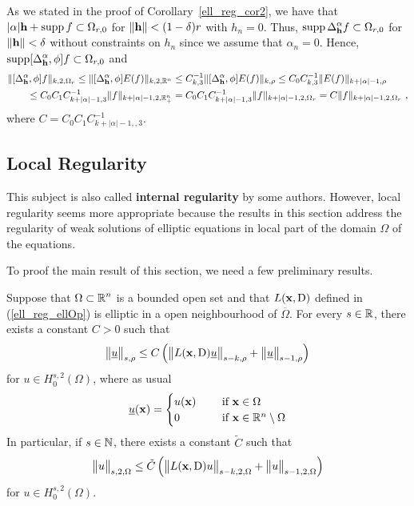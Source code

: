 \begin{rmk}
As we stated in the proof of Corollary~\ref{ell_reg_cor2},
we have that $|\alpha| \mathbf{h} + \operatorname{supp} f \subset \Omega_{r,0}$
for $\|\mathbf{h}\| < (1-\delta)r$ with $h_n = 0$.    Thus,
$\displaystyle \operatorname{supp} \Delta^\alpha_{\mathbf{h}} f \subset \Omega_{r,0}$ for
$\|\mathbf{h}\| < \delta$ without constraints on $h_n$ since we assume
that $\alpha_n = 0$.  Hence,
$\displaystyle \operatorname{supp} [\Delta^\alpha_{\mathbf{h}}, \phi] f \subset \Omega_{r,0}$
and
\begin{align*}
&\| [\Delta^\alpha_{\mathbf{h}}, \phi] f \|_{k,2,\Omega_r}
\leq \| [\Delta^\alpha_{\mathbf{h}}, \phi] E(f) \|_{k,2,\mathbb{R}^n}
\leq C_{k,3}^{-1} \| [\Delta^\alpha_{\mathbf{h}}, \phi] E(f) \|_{k,\rho}
\leq C_0 C_{k,3}^{-1} \| E(f) \|_{k+|\alpha|-1,\rho} \\
&\qquad \leq C_0 C_1 C_{k+|\alpha|-1,3}^{-1} \| f \|_{k+|\alpha|-1,2,\mathbb{R}^n_+}
= C_0 C_1 C_{k+|\alpha|-1,3}^{-1} \| f \|_{k+|\alpha|-1,2,\Omega_r}
= C \| f \|_{k+|\alpha|-1,2,\Omega_r} \ ,
\end{align*}
where $C = C_0 C_1 C_{k+|\alpha|-1,,3}^{-1}$.
\end{rmk}

\subsection{Local Regularity} 

This subject is also called {\bfseries internal
regularity} by some authors.  However,
local regularity seems more appropriate because the results
in this section address the regularity of weak solutions of elliptic
equations in local part of the domain $\Omega$ of the equations.

To proof the main result of this section, we need a few preliminary results.

\begin{prop} \label{ell_reg_in}
Suppose that $\displaystyle \Omega \subset \mathbb{R}^n$ is a bounded open
set and that $L(\mathbf{x},\operatorname{D})$ defined in (\ref{ell_reg_ellOp}) is
elliptic in a open neighbourhood of $\overline{\Omega}$. 
For every $s\in \mathbb{R}$, there exists a constant $C>0$ such that
\begin{equation} \label{ell_reg_in_eqt}
\big\|\underline{u} \big\|_{s,\rho} \leq C \left(
\big\| L(\mathbf{x},\operatorname{D}) \underline{u} \big\|_{s-k,\rho}
+ \big\|\underline{u}\big\|_{s-1,\rho} \right)
\end{equation}
for $\displaystyle u \in H^{s,2}_0(\Omega)$, where as usual
\[
\underline{u}(\mathbf{x}) = \begin{cases}
u(\mathbf{x}) & \quad \ \text{if} \ \mathbf{x} \in \Omega \\
0 & \quad \ \text{if} \ \mathbf{x} \in \mathbb{R}^n\setminus \Omega  
\end{cases}
\]
In particular, if $s \in \mathbb{N}$, there exists a constant $\tilde{C}$ such that
\begin{equation} \label{ell_reg_in_eqtV2}
\big\|u \big\|_{s,2,\Omega} \leq \tilde{C} \left(
\big\| L(\mathbf{x},\operatorname{D}) u \big\|_{s-k,2,\Omega}
+ \big\|u\big\|_{s-1,2,\Omega} \right)
\end{equation}
for $\displaystyle u \in H^{s,2}_0(\Omega)$.
\end{prop}

